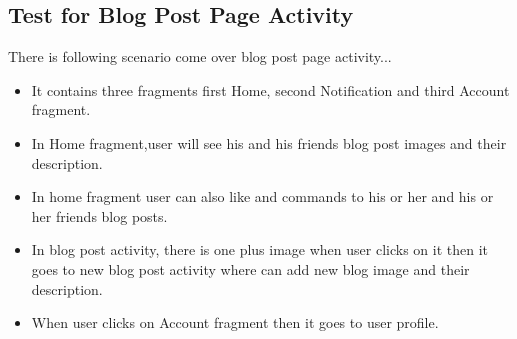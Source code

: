 \subsection{Test for Blog Post Page Activity}
There is following scenario come over blog post page activity...
\begin{itemize}
	\item It contains three fragments first Home, second Notification and third Account fragment.
	\item In Home fragment,user will see his and his friends blog post images and their description.
	\item In home fragment user can also like and commands to his or her and his or her friends blog posts.
	\item In blog post activity, there is one plus image when user clicks on it then it goes to new blog post activity where can add new blog image and their description.
	\item When user clicks on Account fragment then it goes to user profile.
\end{itemize}

